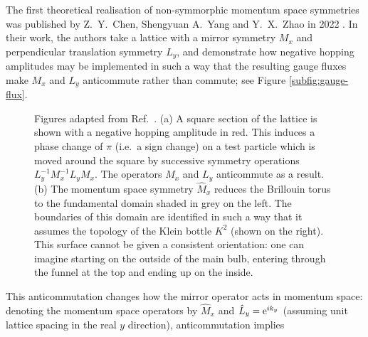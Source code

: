 The first theoretical realisation of non-symmorphic momentum space symmetries was published by Z.~Y.~Chen, Shengyuan A.~Yang and Y.~X.~Zhao in 2022 \cite{CYZ_Klein-gauge}. %
In their work, the authors take a lattice with a mirror symmetry $M_x$ and perpendicular translation symmetry $L_y$, and demonstrate how negative hopping amplitudes may be implemented in such a way that the resulting gauge fluxes make $M_x$ and $L_y$ anticommute rather than commute; see Figure \ref{subfig:gauge-flux}.
\begin{figure}[htb!]
	\centering
	\hfil
	\caption{Figures adapted from Ref.~\cite{CYZ_Klein-gauge}. (a) A square section of the lattice is shown with a negative hopping amplitude in red. This induces a phase change of $\pi$ (i.e.\ a sign change) on a test particle which is moved around the square by successive symmetry operations $L_y^{-1}M_x^{-1}L_yM_x$. The operators $M_x$ and $L_y$ anticommute as a result. (b) The momentum space symmetry $\hat{M}_x$ reduces the Brillouin torus to the fundamental domain shaded in grey on the left. The boundaries of this domain are identified in such a way that it assumes the topology of the Klein bottle $K^2$ (shown on the right). This surface cannot be given a consistent orientation: one can imagine starting on the outside of the main bulb, entering through the funnel at the top and ending up on the inside.}
	\label{fig:CYZ_Klein} %
\end{figure}
This anticommutation changes how the mirror operator acts in momentum space: denoting the momentum space operators by $\hat{M}_x$ and $\hat{L}_y=\operatorname{e}^{ik_y}$ (assuming unit lattice spacing in the real $y$ direction), anticommutation implies
